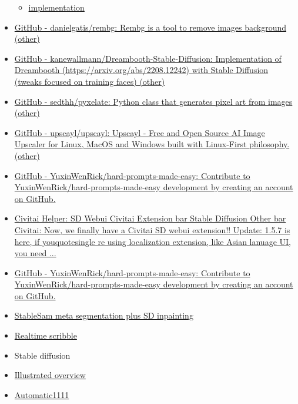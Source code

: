 \begin{itemize}
\begin{itemize}
  \item
    \href{https://github.com/lucidrains/gigagan-pytorch}{implementation}
  \end{itemize}
\item
  \href{https://github.com/danielgatis/rembg}{GitHub -
  danielgatis/rembg: Rembg is a tool to remove images background
  (other)}
\item
  \href{https://github.com/kanewallmann/dreambooth-stable-diffusion}{GitHub
  - kanewallmann/Dreambooth-Stable-Diffusion: Implementation of
  Dreambooth (https://arxiv.org/abs/2208.12242) with Stable Diffusion
  (tweaks focused on training faces) (other)}
\item
  \href{https://github.com/sedthh/pyxelate}{GitHub - sedthh/pyxelate:
  Python class that generates pixel art from images (other)}
\item
  \href{https://github.com/upscayl/upscayl}{GitHub - upscayl/upscayl:  
  Upscayl - Free and Open Source AI Image Upscaler for Linux, MacOS and
  Windows built with Linux-First philosophy. (other)}
\item
  \href{https://github.com/YuxinWenRick/hard-prompts-made-easy}{GitHub -
  YuxinWenRick/hard-prompts-made-easy: Contribute to
  YuxinWenRick/hard-prompts-made-easy development by creating an account
  on GitHub.}
\item
  \href{https://civitai.com/models/16768/civitai-helper-sd-webui-civitai-extension}{Civitai
  Helper: SD Webui Civitai Extension bar{} Stable Diffusion Other
  bar{} Civitai: Now, we finally have a Civitai SD webui
  extension!! Update: 1.5.7 is here, if youquotesingle re using
  localization extension, like Asian lanuage UI, you need ...}
\item
  \href{https://github.com/YuxinWenRick/hard-prompts-made-easy}{GitHub -
  YuxinWenRick/hard-prompts-made-easy: Contribute to
  YuxinWenRick/hard-prompts-made-easy development by creating an account
  on GitHub.}
\item
  \href{https://twitter.com/abhi1thakur/status/1645669023726592007}{StableSam
  meta segmentation plus SD inpainting}
\item
  \href{https://github.com/houseofsecrets/SdPaint}{Realtime scribble}
\item
  Stable diffusion
\item
  \href{https://jalammar.github.io/illustrated-stable-diffusion/}{Illustrated
  overview}
\item
  \href{https://www.thosesixfaces.com/post/stable-diffusion-getting-started-windows}{Automatic1111
}
\end{itemize}
